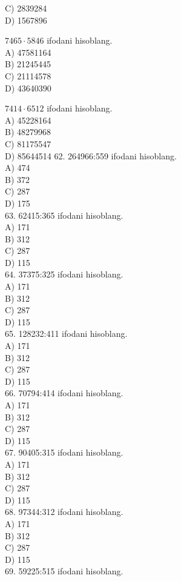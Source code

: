 C) 2839284\\
D) 1567896
  \item $7465 \cdot 5846$ ifodani hisoblang.\\
A) 47581164\\
B) 21245445\\
C) 21114578\\
D) 43640390
  \item $7414 \cdot 6512$ ifodani hisoblang.\\
A) 45228164\\
B) 48279968\\
C) 81175547\\
D) 85644514
62. 264966:559 ifodani hisoblang.\\
A) 474\\
B) 372\\
C) 287\\
D) 175\\
63. 62415:365 ifodani hisoblang.\\
A) 171\\
B) 312\\
C) 287\\
D) 115\\
64. 37375:325 ifodani hisoblang.\\
A) 171\\
B) 312\\
C) 287\\
D) 115\\
65. 128232:411 ifodani hisoblang.\\
A) 171\\
B) 312\\
C) 287\\
D) 115\\
66. 70794:414 ifodani hisoblang.\\
A) 171\\
B) 312\\
C) 287\\
D) 115\\
67. 90405:315 ifodani hisoblang.\\
A) 171\\
B) 312\\
C) 287\\
D) 115\\
68. 97344:312 ifodani hisoblang.\\
A) 171\\
B) 312\\
C) 287\\
D) 115\\
69. 59225:515 ifodani hisoblang.\\
